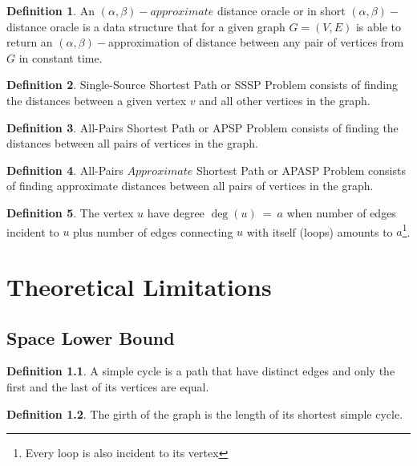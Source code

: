 \documentclass[shortabstract, lic, english]{iithesis}
\theoremstyle{definition} \newtheorem{definition}{Definition}[chapter]
\theoremstyle{plain} \newtheorem{remark}[definition]{Observation}
\theoremstyle{plain} \newtheorem{theorem}[definition]{Theorem}
\theoremstyle{plain} \newtheorem{lemma}[definition]{Lemma}
\theoremstyle{plain} \newtheorem{conjecture}[definition]{Conjecture}
\begin{document}
\begin{definition}
    An $(\alpha,\beta)-approximate$ distance oracle or in short $(\alpha,\beta)-$distance oracle is a data structure that for a given graph $G = (V,E)$ 
    is able to return an $(\alpha, \beta)-$approximation of distance between any pair of vertices from $G$ in constant time.
\end{definition}

\begin{definition}
    Single-Source Shortest Path or SSSP Problem consists of finding the distances between a given vertex $v$ and all other vertices in the graph. 
\end{definition}

\begin{definition}
    All-Pairs Shortest Path or APSP Problem consists of finding the distances between all pairs of vertices in the graph. 
\end{definition}

\begin{definition}
    All-Pairs $Approximate$ Shortest Path or APASP Problem consists of finding approximate distances between all pairs of vertices in the graph. 
\end{definition}

\begin{definition}
    The vertex $u$ have degree $\deg(u)~=~a$ when number of edges incident to $u$ plus number of edges connecting $u$
    with itself (loops) amounts to $a$\footnote{Every loop is also incident to its vertex}.
\end{definition}

\chapter{Theoretical Limitations} \label{theoreticalLimitations}

\section{Space Lower Bound}
\begin{definition}
    A simple cycle is a path that have distinct edges and only the first and the last of its vertices are equal.
\end{definition}

\begin{definition} 
    The girth of the graph is the length of its shortest simple cycle. 
\end{definition}
\end{document}
